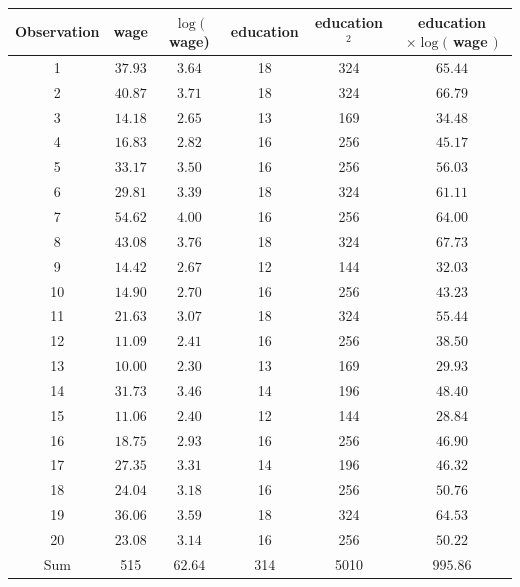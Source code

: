 \documentclass[10pt]{article}
\begin{document}
\begin{tabular}{cccccc}
\hline\hline
Observation & wage & $\log ($ wage) & education & education $^{2}$ & education $\times \log ($ wage $)$ \\
\hline
1 & $37.93$ & $3.64$ & 18 & 324 & $65.44$ \\
2 & $40.87$ & $3.71$ & 18 & 324 & $66.79$ \\
3 & $14.18$ & $2.65$ & 13 & 169 & $34.48$ \\
4 & $16.83$ & $2.82$ & 16 & 256 & $45.17$ \\
5 & $33.17$ & $3.50$ & 16 & 256 & $56.03$ \\
6 & $29.81$ & $3.39$ & 18 & 324 & $61.11$ \\
7 & $54.62$ & $4.00$ & 16 & 256 & $64.00$ \\
8 & $43.08$ & $3.76$ & 18 & 324 & $67.73$ \\
9 & $14.42$ & $2.67$ & 12 & 144 & $32.03$ \\
10 & $14.90$ & $2.70$ & 16 & 256 & $43.23$ \\
11 & $21.63$ & $3.07$ & 18 & 324 & $55.44$ \\
12 & $11.09$ & $2.41$ & 16 & 256 & $38.50$ \\
13 & $10.00$ & $2.30$ & 13 & 169 & $29.93$ \\
14 & $31.73$ & $3.46$ & 14 & 196 & $48.40$ \\
15 & $11.06$ & $2.40$ & 12 & 144 & $28.84$ \\
16 & $18.75$ & $2.93$ & 16 & 256 & $46.90$ \\
17 & $27.35$ & $3.31$ & 14 & 196 & $46.32$ \\
18 & $24.04$ & $3.18$ & 16 & 256 & $50.76$ \\
19 & $36.06$ & $3.59$ & 18 & 324 & $64.53$ \\
20 & $23.08$ & $3.14$ & 16 & 256 & $50.22$ \\
\hline
Sum & 515 & $62.64$ & 314 & 5010 & $995.86$ \\
\hline
\end{tabular}
\end{document}
